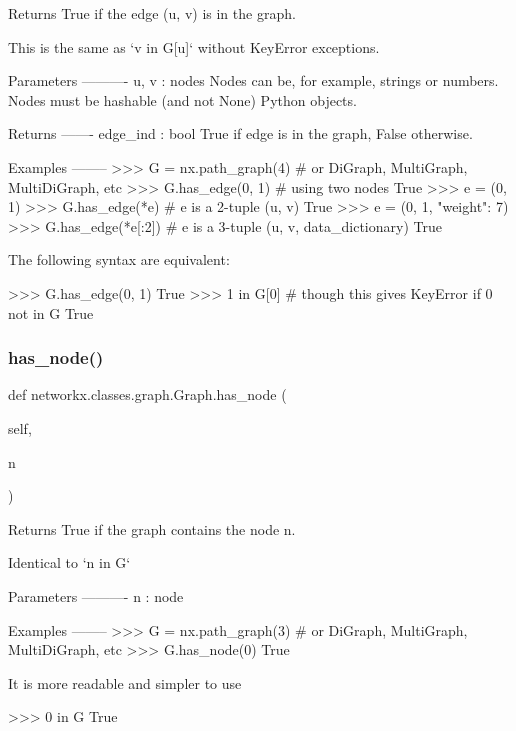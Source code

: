 \begin{DoxyVerb}Returns True if the edge (u, v) is in the graph.

This is the same as `v in G[u]` without KeyError exceptions.

Parameters
----------
u, v : nodes
    Nodes can be, for example, strings or numbers.
    Nodes must be hashable (and not None) Python objects.

Returns
-------
edge_ind : bool
    True if edge is in the graph, False otherwise.

Examples
--------
>>> G = nx.path_graph(4)  # or DiGraph, MultiGraph, MultiDiGraph, etc
>>> G.has_edge(0, 1)  # using two nodes
True
>>> e = (0, 1)
>>> G.has_edge(*e)  #  e is a 2-tuple (u, v)
True
>>> e = (0, 1, {"weight": 7})
>>> G.has_edge(*e[:2])  # e is a 3-tuple (u, v, data_dictionary)
True

The following syntax are equivalent:

>>> G.has_edge(0, 1)
True
>>> 1 in G[0]  # though this gives KeyError if 0 not in G
True\end{DoxyVerb}
 \mbox{\label{classnetworkx_1_1classes_1_1graph_1_1Graph_af67788bc665a6418d802bef946d889a4}} 
\subsubsection{\texorpdfstring{has\+\_\+node()}{has\_node()}}
{\footnotesize\ttfamily def networkx.\+classes.\+graph.\+Graph.\+has\+\_\+node (\begin{DoxyParamCaption}\item[{}]{self,  }\item[{}]{n }\end{DoxyParamCaption})}

\begin{DoxyVerb}Returns True if the graph contains the node n.

Identical to `n in G`

Parameters
----------
n : node

Examples
--------
>>> G = nx.path_graph(3)  # or DiGraph, MultiGraph, MultiDiGraph, etc
>>> G.has_node(0)
True

It is more readable and simpler to use

>>> 0 in G
True\end{DoxyVerb}
 \mbox{\label{classnetworkx_1_1classes_1_1graph_1_1Graph_abe76c34d26c7acd7d2a87b198da554ff}} 
